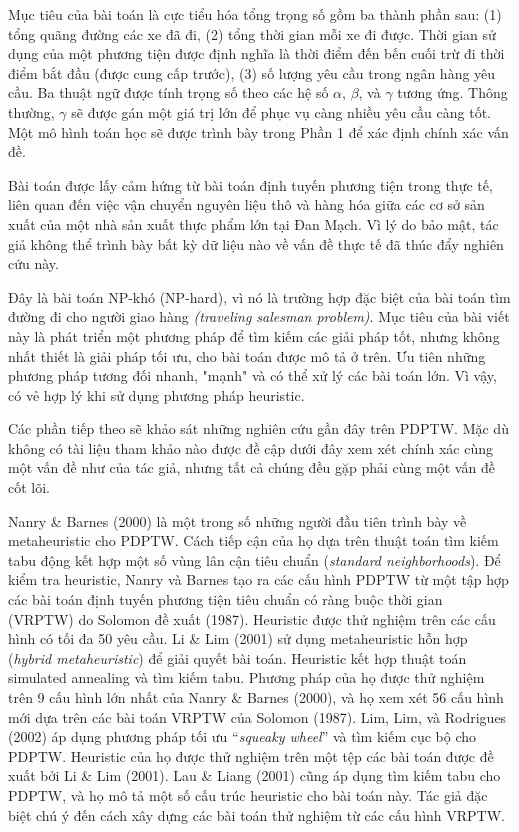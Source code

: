 Mục tiêu của bài toán là cực tiểu hóa tổng trọng số gồm ba thành phần sau: (1) tổng quãng đường các xe đã đi, (2) tổng thời gian mỗi xe đi được. Thời gian sử dụng của một phương tiện được định nghĩa là thời điểm đến bến cuối trừ đi thời điểm bắt đầu (được cung cấp trước), (3) số lượng yêu cầu trong ngân hàng yêu cầu.
Ba thuật ngữ được tính trọng số theo các hệ số $\alpha$, $\beta$, và $\gamma$ tương ứng. Thông thường, $\gamma$ sẽ được gán một giá trị lớn để phục vụ càng nhiều yêu cầu càng tốt. Một mô hình toán học sẽ được trình bày trong Phần 1 để xác định chính xác vấn đề.

Bài toán được lấy cảm hứng từ bài toán định tuyến phương tiện trong thực tế, liên quan đến việc vận chuyển nguyên liệu thô và hàng hóa giữa các cơ sở sản xuất của một nhà sản xuất thực phẩm lớn tại Đan Mạch. Vì lý do bảo mật, tác giả không thể trình bày bất kỳ dữ liệu nào về vấn đề thực tế đã thúc đẩy nghiên cứu này.

Đây là bài toán NP-khó (NP-hard), vì nó là trường hợp đặc biệt của bài toán tìm đường đi cho người giao hàng \textit{(traveling salesman problem)}. Mục tiêu của bài viết này là phát triển một phương pháp để tìm kiếm các giải pháp tốt, nhưng không nhất thiết là giải pháp tối ưu, cho bài toán được mô tả ở trên. Ưu tiên những phương pháp tương đối nhanh, "mạnh" và có thể xử lý các bài toán lớn. Vì vậy, có vẻ hợp lý khi sử dụng phương pháp heuristic.

Các phần tiếp theo sẽ khảo sát những nghiên cứu gần đây trên PDPTW. Mặc dù không có tài liệu tham khảo nào được đề cập dưới đây xem xét chính xác cùng một vấn đề như của tác giả, nhưng tất cả chúng đều gặp phải cùng một vấn đề cốt lõi.

Nanry \& Barnes (2000) là một trong số những người đầu tiên trình bày về metaheuristic cho PDPTW. Cách tiếp cận của họ dựa trên thuật toán tìm kiếm tabu động kết hợp một số vùng lân cận tiêu chuẩn (\textit{standard neighborhoods}). Để kiểm tra heuristic, Nanry và Barnes tạo ra các cấu hình PDPTW từ một tập hợp các bài toán định tuyến phương tiện tiêu chuẩn có ràng buộc thời gian (VRPTW) do Solomon đề xuất (1987). Heuristic được thử nghiệm trên các cấu hình có tối đa 50 yêu cầu. Li \& Lim (2001) sử dụng metaheuristic hỗn hợp (\textit{hybrid metaheuristic}) để giải quyết bài toán. Heuristic kết hợp thuật toán simulated annealing và tìm kiếm tabu. Phương pháp của họ được thử nghiệm trên 9 cấu hình lớn nhất của Nanry \& Barnes (2000), và họ xem xét 56 cấu hình mới dựa trên các bài toán VRPTW của Solomon (1987).
Lim, Lim, và Rodrigues (2002) áp dụng phương pháp tối ưu “\textit{squeaky wheel}” và tìm kiếm cục bộ cho PDPTW. Heuristic của họ được thử nghiệm trên một tệp các bài toán được đề xuất bởi Li \& Lim (2001). Lau \& Liang (2001) cũng áp dụng tìm kiếm tabu cho PDPTW, và họ mô tả một số cấu trúc heuristic cho bài toán này. Tác giả đặc biệt chú ý đến cách xây dựng các bài toán thử nghiệm từ các cấu hình VRPTW.

